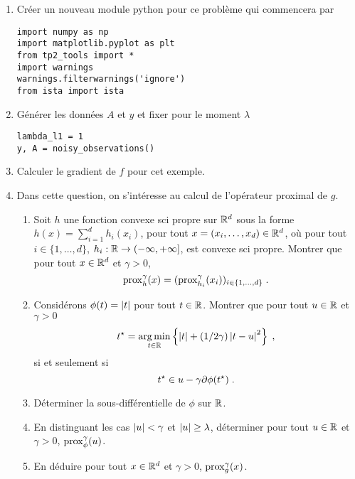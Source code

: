 \documentclass[a4paper,french,12pt]{article}
\begin{document}
\begin{enumerate}
\item Créer un nouveau module python pour ce problème qui commencera par
\begin{lstlisting}
import numpy as np
import matplotlib.pyplot as plt
from tp2_tools import *
import warnings
warnings.filterwarnings('ignore')
from ista import ista
\end{lstlisting}
\item Générer les données $A$ et $y$ et fixer pour le moment $\lambda$
  \begin{lstlisting}
lambda_l1 = 1
y, A = noisy_observations()
  \end{lstlisting}
\item Calculer le gradient de $f$ pour cet exemple.
\item Dans cette question, on s'intéresse au calcul de l'opérateur
  proximal de $g$.
  \begin{enumerate}
  \item Soit $h$ une fonction convexe sci propre sur $\mathbb{R}^d$ sous la
    forme $h(x)= \sum_{i=1}^d h_i(x_i)$, pour tout
    $x = (x_i,\ldots,x_d)\in \mathbb{R}^d$, où pour tout
    $i \in \{1,\ldots,d\}$,
    $h_i : \mathbb{R} \to \left(-\infty,+\infty\right]$, est convexe sci
    propre. Montrer que pour tout $x \in \mathbb{R}^d$ et $\gamma >0$,
    \begin{equation*}
      \operatorname{prox}_h^{\gamma}(x) = (      \operatorname{prox}_{h_i}^{\gamma}(x_i))_{i \in \{1,\ldots,d\}} \;. 
    \end{equation*}
  \item Considérons $\phi(t) = \left\vert t \right\vert$ pour tout $t \in \mathbb{R}$.
    Montrer que pour tout $u \in \mathbb{R}$ et $\gamma >0$
    \begin{equation*}
      t^{\star} = \mathop{\mathrm{arg\,min}}_{t \in \mathbb{R}} \left\lbrace \left\vert t \right\vert + (1/2\gamma) \left\vert t-u \right\vert^2 \right\rbrace \;,
    \end{equation*}
    si et seulement si
    \begin{equation*}
      t^{\star} \in u - \gamma \partial \phi(t^{\star}) \;. 
    \end{equation*}
  \item Déterminer la sous-différentielle de $\phi$ sur $\mathbb{R}$.
    
  \item En distinguant les cas $\left\vert u \right\vert < \gamma$ et $\left\vert u \right\vert \geq \lambda$, déterminer pour tout $u \in \mathbb{R}$ et $\gamma >0$, $\operatorname{prox}_{\phi}^{\gamma}(u)$.
    
  \item En déduire pour tout $x \in \mathbb{R}^d$ et $\gamma >0$, $\operatorname{prox}_{g}^{\gamma}(x)$. 
  \end{enumerate}
  

\end{enumerate}
\end{document}
